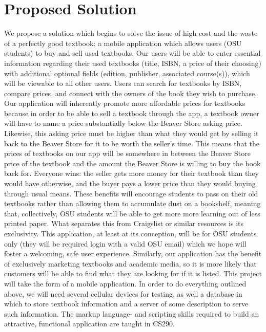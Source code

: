 \documentclass[12pt]{article}
\begin{document}
\section{Proposed Solution}
We propose a solution which begins to solve the issue of high cost and the waste of a perfectly good textbook: a mobile application which allows users (OSU students) to buy and sell used textbooks. Our users will be able to enter essential information regarding their used textbooks (title, ISBN, a price of their choosing) with additional optional fields (edition, publisher, associated course(s)), which will be viewable to all other users. Users can search for textbooks by ISBN, compare prices, and connect with the owners of the book they wish to purchase. 
Our application will inherently promote more affordable prices for textbooks because in order to be able to sell a textbook through the app, a textbook owner will have to name a price substantially below the Beaver Store asking price. Likewise, this asking price must be higher than what they would get by selling it back to the Beaver Store for it to be worth the seller’s time. This means that the prices of textbooks on our app will be somewhere in between the Beaver Store price of the textbook and the amount the Beaver Store is willing to buy the book back for. Everyone wins: the seller gets more money for their textbook than they would have otherwise, and the buyer pays a lower price than they would buying through usual means. These benefits will encourage students to pass on their old textbooks rather than allowing them to accumulate dust on a bookshelf, meaning that, collectively, OSU students will be able to get more more learning out of less printed paper. 
What separates this from Craigslist or similar resources is its exclusivity. This application, at least at its conception, will be for OSU students only (they will be required login with a valid OSU email) which we hope will foster a welcoming, safe user experience. Similarly, our application has the benefit of exclusively marketing textbooks and academic media, so it is more likely that customers will be able to find what they are looking for if it is listed. 
This project will take the form of a mobile application. In order to do everything outlined above, we will need several cellular devices for testing, as well a database in which to store textbook information and a server of some description to serve such information. The markup language- and scripting skills required to build an attractive, functional application are taught in CS290. 
\end{document}
